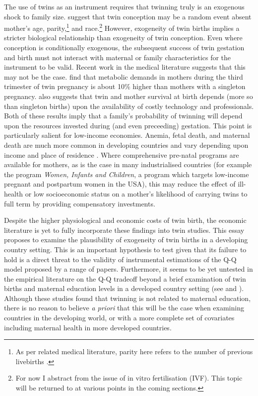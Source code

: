 \documentclass{article}[11pt,subeqn]
\begin{document}
\begin{spacing}{1.5}
The use of twins as an instrument requires that twinning truly is an exogenous shock to family size.  \citet{Kahnetal2003} suggest that twin conception may be a random event absent mother's age, 
parity,\footnote{As per related medical literature, parity here refers to the number of previous livebirths \citep{Elwood1978}.} and race.\footnote{For now I abstract from 
the issue of in vitro fertilisation (IVF).  This topic will be returned to at various points in the coming sections.} However, exogeneity of twin births implies a stricter 
biological relationship than exogeneity of twin conception.  Even where conception is conditionally exogenous, the subsequent success of twin gestation and birth must not interact with maternal or family characteristics for the instrument to be valid.  Recent work in the medical literature 
suggests that this may not be the case. \citet{Shinagawaetal2005} find that metabolic demands in mothers during the third trimester of twin pregnancy is about 10\% higher 
than mothers with a singleton pregnancy. \citet{Philipson2008}  also suggests that twin and mother survival at birth depends (more so than singleton births) upon the availability 
of costly technology and professionals.  Both of these results imply that a family's probability of twinning will depend upon the resources invested during (and even preceeding) 
gestation.  This point is particularly salient for low-income economies.  Anemia, fetal death, and maternal death are much more common in developing countries and vary depending 
upon income and place of residence \citep{Rush2000}.  Where comprehensive pre-natal programs are available for mothers, as is the case in many industrialised countries (for 
example the program \emph{Women, Infants and Children}, a program which targets low-income pregnant and postpartum women in the USA), this 
may reduce the effect of ill-health or low socioeconomic status on a mother's likelihood of carrying twins to full term by providing compensatory investments.

Despite the higher physiological and economic costs of twin birth, the economic literature is yet to fully incorporate these findings into twin studies.  This essay proposes to examine the plausibility of exogeneity of twin births in a developing country setting.  This is an important hypothesis to test given that its failure to
hold is a direct threat to the validity of instrumental estimations of the Q-Q model proposed by a range of papers.  Furthermore, it seems to be yet untested in the
empirical literature on the Q-Q tradeoff beyond a brief examination of twin births and maternal education levels in a developed country setting (see \citet{Blacketal2005}
and \citet{Angristetal2010}).  Although these studies found that twinning is not related to maternal education, there is no reason to believe \emph{a priori} that this
will be the case when examining countries in the developing world, or with a more complete set of covariates including maternal health in more developed countries. 


\end{spacing}
\end{document}
